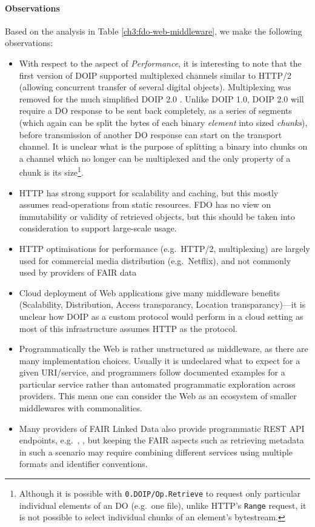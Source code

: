 \paragraph{Observations}

Based on the analysis in Table \vref{ch3:fdo-web-middleware}, we make the following observations:

\begin{itemize}
  \item
    With respect to the aspect of \emph{Performance}, it is interesting to note that the first version of \acrshort{DOIP} \cite{Reilly 2009} supported multiplexed channels similar to HTTP/2 (allowing concurrent transfer of several digital objects). Multiplexing was removed for the much simplified DOIP 2.0 \cite{DONA 2018}. Unlike DOIP 1.0, DOIP 2.0 will require a DO response to be sent back completely, as a series of segments (which again can be split the bytes of each binary \emph{element} into sized \emph{chunks}), before transmission of another DO response can start on the transport channel. It is unclear what is the purpose of splitting a binary into chunks on a channel which no longer can be multiplexed and the only property of a chunk is its size\footnote{Although it is possible with \texttt{0.DOIP/Op.Retrieve} to request only particular individual elements of an DO (e.g.~one file), unlike HTTP's \texttt{Range} request, it is not possible to select individual chunks of an element's bytestream.}.
  \item
    \acrshort{HTTP} has strong support for scalability and caching, but this mostly assumes read-operations from static resources. FDO has no view on immutability or validity of retrieved objects, but this should be taken into consideration to support large-scale usage.
  \item
    HTTP optimisations for performance (e.g.~HTTP/2, multiplexing) are largely used for commercial media distribution (e.g.~Netflix), and not commonly used by providers of FAIR data
  \item
    Cloud deployment of Web applications give many middleware benefits (Scalability, Distribution, Access transparancy, Location transparancy)---it is unclear how DOIP as a custom protocol would perform in a cloud setting as most of this infrastructure assumes HTTP as the protocol.
  \item
    Programmatically the Web is rather unstructured as middleware, as there are many implementation choices. Usually it is undeclared what to expect for a given URI/service, and programmers follow documented examples for a particular service rather than automated programmatic exploration across providers. This mean one can consider the Web as an ecosystem of smaller middlewares with commonalities.
  \item
    Many providers of FAIR Linked Data also provide programmatic REST API endpoints, e.g.~, , but keeping the FAIR aspects such as retrieving metadata in such a scenario may require combining different services using multiple formats and identifier conventions.
\end{itemize}


